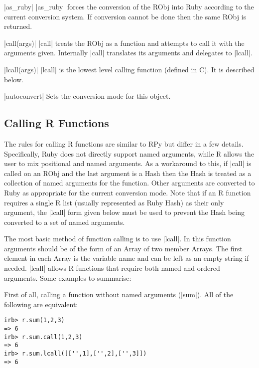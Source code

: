\documentclass[a4paper,12pt]{book}
\newenvironment{TabularDescription}[1]
  {\begin{list}{}%
    {\renewcommand\makelabel[1]{##1:\hfill}%
     \settowidth\labelwidth{\makelabel{#1}}%
     \setlength\leftmargin{\labelwidth+\labelsep}}}%
  {\end{list}}
\begin{document}
\begin{TabularDescription}{|autconvert|}
\item[|as\_ruby|] |as_ruby| forces the conversion of the RObj into Ruby according to the current conversion system. If conversion cannot be done then the same RObj is returned.
\item[|call(args)|] |call| treats the RObj as a function and attempts to call it with the arguments given. Internally |call| translates its arguments and delegates to |lcall|.
\item[|lcall(args)|] |lcall| is the lowest level calling function (defined in C). It is described below.
\item[|autoconvert|] Sets the conversion mode for this object.
\end{TabularDescription}

\subsection{Calling R Functions}\label{calling_R_functions}

The rules for calling R functions are similar to RPy but differ in a few details. Specifically, Ruby does not directly support named arguments, while R allows the user to mix positional and named arguments. As a workaround to this, if |call| is called on an RObj and the last argument is a Hash then the Hash is treated as a collection of named arguments for the function. Other arguments are converted to Ruby as appropriate for the current conversion mode. Note that if an R function requires a single R list (usually represented as Ruby Hash) as their only argument, the |lcall| form given below must be used to prevent the Hash being converted to a set of named arguments.

The most basic method of function calling is to use |lcall|. In this function arguments should be of the form of an Array of two member Arrays. The first element in each Array is the variable name and can be left as an empty string if needed. |lcall| allows R functions that require both named and ordered arguments. Some examples to summarise:

First of all, calling a function without named arguments (|sum|). All of the following are equivalent:

\begin{Verbatim}
irb> r.sum(1,2,3)
=> 6
irb> r.sum.call(1,2,3)
=> 6
irb> r.sum.lcall([['',1],['',2],['',3]])
=> 6
\end{Verbatim}
\end{document}
